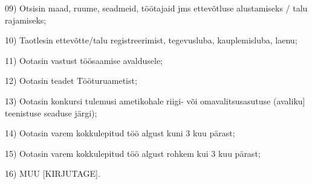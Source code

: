 \documentclass[a4paper]{article}
\begin{document}
\begin{description}
\begin{inparaitem}
  \item[09)] Otsisin maad, ruume, seadmeid, töötajaid jms ettevõtluse alustamiseks / talu rajamiseks;
  \item[10)] Taotlesin ettevõtte/talu registreerimist, tegevusluba, kauplemisluba, laenu;
  \item[11)] Ootasin vastust töösaamise avaldusele;
  \item[12)] Ootasin teadet Tööturuametist;
  \item[13)] Ootasin konkursi tulemusi ametikohale riigi- või omavalitsusasutuse (avaliku] teenistuse seaduse järgi);
  \item[14)] Ootasin varem kokkulepitud töö algust kuni 3 kuu pärast;
  \item[15)] Ootasin varem kokkulepitud töö algust rohkem kui 3 kuu pärast;
  \item[16)] MUU [KIRJUTAGE].
  \end{inparaitem}


\end{description}
\end{document}
